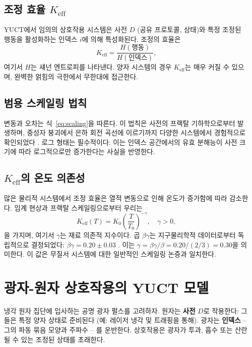 \documentclass[12pt,a4paper]{article}
\newcommand{\Keff}{K_{\mathrm{eff}}}
\newcommand{\betagamma}{\beta\gamma}
\newcommand{\betac}{\beta}
\begin{document}
	\subsection{조정 효율 \(\Keff\)}
	
	YUCT에서 임의의 상호작용 시스템은 사전 \(D\) (공유 프로토콜, 상태)와 특정 조정된 행동을 활성화하는 인덱스 \(i\)에 의해 특성화된다. 조정의 효율은
	\begin{equation}
		\Keff = \frac{H(\text{행동})}{H(\text{인덱스})},
	\end{equation}
	여기서 \(H\)는 섀넌 엔트로피를 나타낸다. 양자 시스템의 경우 \(\Keff\)는 매우 커질 수 있으며, 완벽한 얽힘의 극한에서 무한대에 접근한다.
	
	\subsection{범용 스케일링 법칙}
	
	변동과 오차는 식~\eqref{eq:scaling}을 따른다. 이 법칙은 사전의 프랙탈 기하학으로부터 발생하며, 중성자 붕괴에서 은하 회전 곡선에 이르기까지 다양한 시스템에서 경험적으로 확인되었다 \cite{Yakushev2026c}. 로그 형태는 필수적이다: 이는 인덱스 공간에서의 유효 분해능이 사전 크기에 따라 로그적으로만 증가한다는 사실을 반영한다.
	
	\subsection{\(\Keff\)의 온도 의존성}
	
	많은 물리적 시스템에서 조정 효율은 열적 변동으로 인해 온도가 증가함에 따라 감소한다. 임계 현상과 프랙탈 스케일링으로부터 우리는
	\begin{equation}
		\Keff(T) = K_0 \left(\frac{T}{T_0}\right)^{-\gamma}, \quad \gamma > 0,
		\label{eq:K_T}
	\end{equation}
	을 가지며, 여기서 \(\gamma\)는 재료 의존적 지수이다. 곱 \(\betac\gamma\)는 지구물리학적 데이터로부터 독립적으로 결정되었다: \(\betagamma = 0.20 \pm 0.03\) \cite{Yakushev2026b}. 이는 \(\gamma = \betagamma / \betac = 0.20 / (2/3) = 0.30\)을 의미한다. 이 값은 무질서 시스템에 대한 일반적인 스케일링 논증과 일치한다.
	
	\section{광자-원자 상호작용의 YUCT 모델}
	
	냉각 원자 집단에 입사하는 공명 광자 펄스를 고려하자. 원자는 \textbf{사전} \(D\)로 작용한다: 그들은 특정 양자 상태로 준비된다 (예: 레이저 냉각 및 트래핑을 통해). 광자는 \textbf{인덱스} – 그의 파동 묶음 모양과 주파수 – 를 운반한다. 상호작용은 광자가 투과, 흡수 또는 산란될 수 있는 조정된 상태를 초래한다.
	
\end{document}
